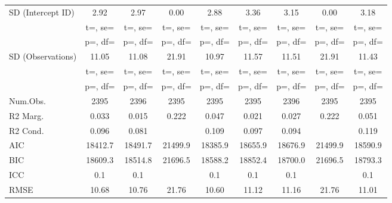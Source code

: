 \documentclass[]{report}
\begin{document}
\begin{table}
{\begin{tabular}[t]{lcccccccc}
		SD (Intercept ID) & \num{2.92} & \num{2.97} & \num{0.00} & \num{2.88} & \num{3.36} & \num{3.15} & \num{0.00} & \num{3.18}\\
		& t=, se= & t=, se= & t=, se= & t=, se= & t=, se= & t=, se= & t=, se= & t=, \vphantom{1} se=\\
		& p=, df= & p=, df= & p=, df= & p=, df= & p=, df= & p=, df= & p=, df= & p=, \vphantom{1} df=\\
		SD (Observations) & \num{11.05} & \num{11.08} & \num{21.91} & \num{10.97} & \num{11.57} & \num{11.51} & \num{21.91} & \num{11.43}\\
		& t=, se= & t=, se= & t=, se= & t=, se= & t=, se= & t=, se= & t=, se= & t=, se=\\
		& p=, df= & p=, df= & p=, df= & p=, df= & p=, df= & p=, df= & p=, df= & p=, df=\\
		\midrule
		Num.Obs. & \num{2395} & \num{2396} & \num{2395} & \num{2395} & \num{2395} & \num{2396} & \num{2395} & \num{2395}\\
		R2 Marg. & \num{0.033} & \num{0.015} & \num{0.222} & \num{0.047} & \num{0.021} & \num{0.027} & \num{0.222} & \num{0.051}\\
		R2 Cond. & \num{0.096} & \num{0.081} &  & \num{0.109} & \num{0.097} & \num{0.094} &  & \num{0.119}\\
		AIC & \num{18412.7} & \num{18491.7} & \num{21499.9} & \num{18385.9} & \num{18655.9} & \num{18676.9} & \num{21499.9} & \num{18590.9}\\
		BIC & \num{18609.3} & \num{18514.8} & \num{21696.5} & \num{18588.2} & \num{18852.4} & \num{18700.0} & \num{21696.5} & \num{18793.3}\\
		ICC & \num{0.1} & \num{0.1} &  & \num{0.1} & \num{0.1} & \num{0.1} &  & \num{0.1}\\
		RMSE & \num{10.68} & \num{10.76} & \num{21.76} & \num{10.60} & \num{11.12} & \num{11.16} & \num{21.76} & \num{11.01}\\
		\bottomrule
	\end{tabular}}
\end{table}
\end{document}
